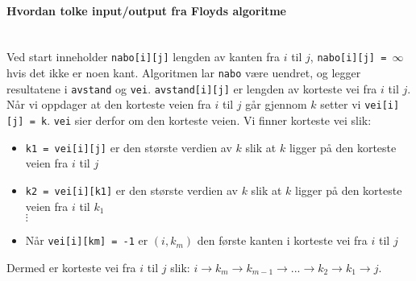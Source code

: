 \paragraph{Hvordan tolke input/output fra Floyds algoritme}~\\
Ved start inneholder \verb|nabo[i][j]| lengden av kanten fra $ i $ til $ j $, \verb|nabo[i][j] = |$ \infty $ hvis det ikke er noen kant. Algoritmen lar \verb|nabo| være uendret, og legger resultatene i \verb|avstand| og \verb|vei|. \verb|avstand[i][j]| er lengden av korteste vei fra $ i $ til $ j $. Når vi oppdager at den korteste veien fra $ i $ til $ j $ går gjennom $ k $ setter vi \verb|vei[i][j] = k|. \verb|vei| sier derfor om den korteste veien. Vi finner korteste vei slik:
\begin{itemize}
\item \verb|k1 = vei[i][j]| er den største verdien av $ k $ slik at $ k $ ligger på den korteste veien fra $ i $ til $ j $
\item \verb|k2 = vei[i][k1]| er den største verdien av $ k $ slik at $ k $ ligger på den korteste veien fra $ i $ til $ k_1 $
\\ $ \vdots $
\item Når \verb|vei[i][km] = -1| er $ (i, k_m) $ den første kanten i korteste vei fra $ i $ til $ j $
\end{itemize}
Dermed er korteste vei fra $ i $ til $ j $ slik: $ i \rightarrow k_m \rightarrow k_{m-1} \rightarrow ... \rightarrow k_2 \rightarrow k_1 \rightarrow j $. 